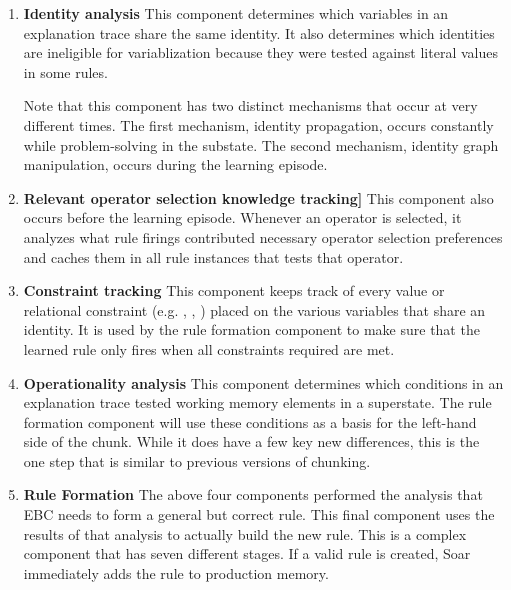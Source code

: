 \begin{enumerate}
	\item \textbf{Identity analysis}  \newline
	This component determines which variables in an explanation trace share the same identity.  It also determines which identities are ineligible for variablization because they were tested against literal values in some rules.  

	Note that this component has two distinct mechanisms that occur at very different times.  The first mechanism, identity propagation, occurs constantly while problem-solving in the substate.  The second mechanism, identity graph manipulation, occurs during the learning episode.

	\item \textbf{Relevant operator selection knowledge tracking]} \newline
	This component also occurs before the learning episode.  Whenever an operator is selected, it analyzes what rule firings contributed necessary operator selection preferences and caches them in all rule instances that tests that operator. 

	\item \textbf{Constraint tracking} \newline
	This component keeps track of every value or relational constraint (e.g. , , ) placed on the various variables that share an identity.  It is used by the rule formation component to make sure that the learned rule only fires when all constraints required are met.

	\item \textbf{Operationality analysis} \newline
	This component determines which conditions in an explanation trace tested working memory elements in a superstate.  The rule formation component will use these conditions as a basis for the left-hand side of the chunk.  While it does have a few key new differences, this is the one step that is similar to previous versions of chunking.

	\item \textbf{Rule Formation} \newline
	The above four components performed the analysis that EBC needs to form a general but correct rule.  This final component uses the results of that analysis to actually build the new rule.  This is a complex component that has seven different stages.  If a valid rule is created, Soar immediately adds the rule to production memory.
\end{enumerate}

